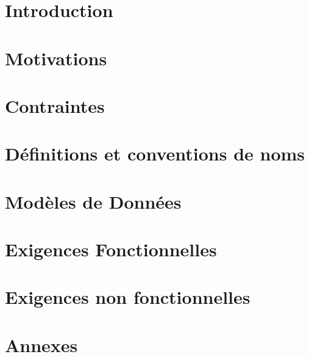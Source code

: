 



\pagestyle{fancy} 






\tableofcontents
{}


\chapter{Introduction}


\chapter{Motivations}


\chapter{Contraintes}


\chapter{Définitions et conventions de noms}


\chapter{Modèles de Données}



\chapter{Exigences Fonctionnelles}


\chapter{Exigences non fonctionnelles}



\pagestyle{fancy} 





\appendix
\chapter{Annexes}


\listoffigures



